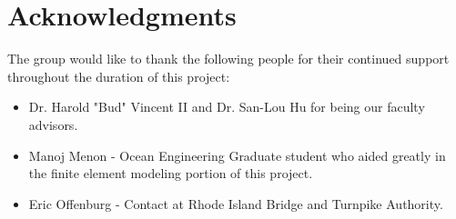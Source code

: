 \section*{Acknowledgments}
The group would like to thank the following people for their continued
 support throughout the duration of this project:

\begin{itemize}
\item Dr. Harold "Bud" Vincent II and Dr. San-Lou Hu for being our
 faculty advisors.
 
\item Manoj Menon - Ocean Engineering Graduate student who aided
 greatly in the finite element modeling portion of this project.
 
\item Eric Offenburg - Contact at Rhode Island Bridge and Turnpike
 Authority.
\end{itemize}